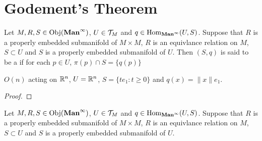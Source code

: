 \documentclass{book}
\begin{document}
	
	
	
	
	
	
	
	
	
	
	\newpage
	\section{Godement's Theorem}


\begin{defn} 
	Let $M, R, S \in \operatorname{Obj}(\operatorname*{\text{\textbf{Man}}^{\infty}})$, $U \in \mathcal{T}_M$ and $q \in \operatorname{Hom}_{\operatorname*{\text{\textbf{Man}}^{\infty}}}(U, S)$. Suppose that $R$ is a properly embedded submanifold of $M \times M$, $R$ is an equivlance relation on $M$, $S \subset U$ and $S$ is a properly embedded submanifold of $U$. Then $(S, q)$ is said to be a  if for each $p \in U$, $\pi(p) \cap S = \{q(p)\}$
\end{defn}

\begin{ex} 
	$O(n)$ acting on $\mathbb{R}^n$, $U = \mathbb{R}^n$, $S = \{te_1:t \geq 0\}$ and $q(x) = \|x\|e_1$.
\end{ex}

\begin{proof}
	
\end{proof}



\begin{ex}  
	Let $M, R, S \in \operatorname{Obj}(\operatorname*{\text{\textbf{Man}}^{\infty}})$, $U \in \mathcal{T}_M$ and $q \in \operatorname{Hom}_{\operatorname*{\text{\textbf{Man}}^{\infty}}}(U, S)$. Suppose that $R$ is a properly embedded submanifold of $M \times M$, $R$ is an equivlance relation on $M$, $S \subset U$ and $S$ is a properly embedded submanifold of $U$. 
\end{ex}
\end{document}
